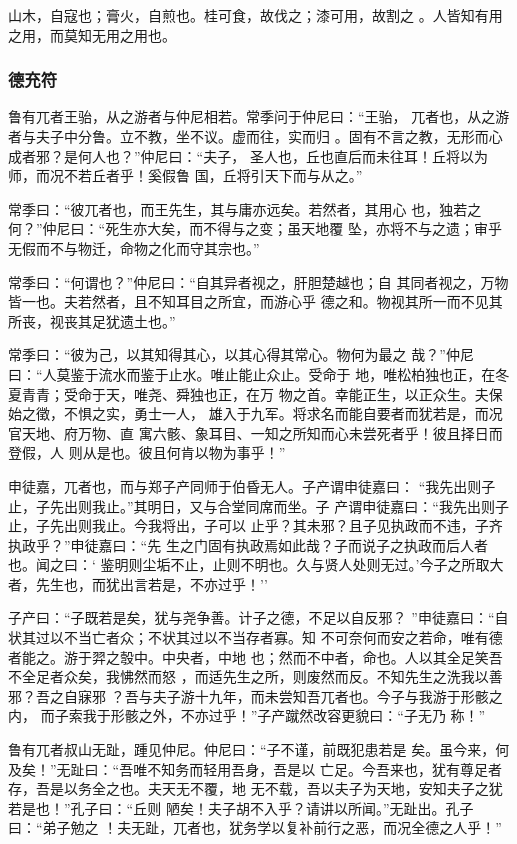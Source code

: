 \documentclass[]{article}
\begin{document}
山木，自寇也；膏火，自煎也。桂可食，故伐之；漆可用，故割之
。人皆知有用之用，而莫知无用之用也。

\hypertarget{header-n2029}{%
\subsubsection{德充符}\label{header-n2029}}

鲁有兀者王骀，从之游者与仲尼相若。常季问于仲尼曰：``王骀，
兀者也，从之游者与夫子中分鲁。立不教，坐不议。虚而往，实而归
。固有不言之教，无形而心成者邪？是何人也？''仲尼曰：``夫子，
圣人也，丘也直后而未往耳！丘将以为师，而况不若丘者乎！奚假鲁
国，丘将引天下而与从之。''

常季曰：``彼兀者也，而王先生，其与庸亦远矣。若然者，其用心
也，独若之何？''仲尼曰：``死生亦大矣，而不得与之变；虽天地覆
坠，亦将不与之遗；审乎无假而不与物迁，命物之化而守其宗也。''

常季曰：``何谓也？''仲尼曰：``自其异者视之，肝胆楚越也；自
其同者视之，万物皆一也。夫若然者，且不知耳目之所宜，而游心乎
德之和。物视其所一而不见其所丧，视丧其足犹遗土也。''

常季曰：``彼为己，以其知得其心，以其心得其常心。物何为最之
哉？''仲尼曰：``人莫鉴于流水而鉴于止水。唯止能止众止。受命于
地，唯松柏独也正，在冬夏青青；受命于天，唯尧、舜独也正，在万
物之首。幸能正生，以正众生。夫保始之徵，不惧之实，勇士一人，
雄入于九军。将求名而能自要者而犹若是，而况官天地、府万物、直
寓六骸、象耳目、一知之所知而心未尝死者乎！彼且择日而登假，人
则从是也。彼且何肯以物为事乎！''

申徒嘉，兀者也，而与郑子产同师于伯昏无人。子产谓申徒嘉曰：
``我先出则子止，子先出则我止。''其明日，又与合堂同席而坐。子
产谓申徒嘉曰：``我先出则子止，子先出则我止。今我将出，子可以
止乎？其未邪？且子见执政而不违，子齐执政乎？''申徒嘉曰：``先
生之门固有执政焉如此哉？子而说子之执政而后人者也。闻之曰：`
鉴明则尘垢不止，止则不明也。久与贤人处则无过。'今子之所取大
者，先生也，而犹出言若是，不亦过乎！''

子产曰：``子既若是矣，犹与尧争善。计子之德，不足以自反邪？
''申徒嘉曰：``自状其过以不当亡者众；不状其过以不当存者寡。知
不可奈何而安之若命，唯有德者能之。游于羿之彀中。中央者，中地
也；然而不中者，命也。人以其全足笑吾不全足者众矣，我怫然而怒
，而适先生之所，则废然而反。不知先生之洗我以善邪？吾之自寐邪
？吾与夫子游十九年，而未尝知吾兀者也。今子与我游于形骸之内，
而子索我于形骸之外，不亦过乎！''子产蹴然改容更貌曰：``子无乃 称！''

鲁有兀者叔山无趾，踵见仲尼。仲尼曰：``子不谨，前既犯患若是
矣。虽今来，何及矣！''无趾曰：``吾唯不知务而轻用吾身，吾是以
亡足。今吾来也，犹有尊足者存，吾是以务全之也。夫天无不覆，地
无不载，吾以夫子为天地，安知夫子之犹若是也！''孔子曰：``丘则
陋矣！夫子胡不入乎？请讲以所闻。''无趾出。孔子曰：``弟子勉之
！夫无趾，兀者也，犹务学以复补前行之恶，而况全德之人乎！''
\end{document}
